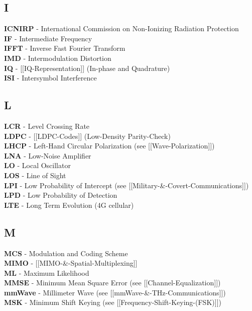 \subsection{I}\label{sec:acronyms-i}

\textbf{ICNIRP} - International Commission on Non-Ionizing Radiation
Protection\\
\textbf{IF} - Intermediate Frequency\\
\textbf{IFFT} - Inverse Fast Fourier Transform\\
\textbf{IMD} - Intermodulation Distortion\\
\textbf{IQ} - {[}{[}IQ-Representation{]}{]} (In-phase and Quadrature)\\
\textbf{ISI} - Intersymbol Interference

\subsection{L}\label{sec:acronyms-l}

\textbf{LCR} - Level Crossing Rate\\
\textbf{LDPC} - {[}{[}LDPC-Codes{]}{]} (Low-Density Parity-Check)\\
\textbf{LHCP} - Left-Hand Circular Polarization (see
{[}{[}Wave-Polarization{]}{]})\\
\textbf{LNA} - Low-Noise Amplifier\\
\textbf{LO} - Local Oscillator\\
\textbf{LOS} - Line of Sight\\
\textbf{LPI} - Low Probability of Intercept (see
{[}{[}Military-\&-Covert-Communications{]}{]})\\
\textbf{LPD} - Low Probability of Detection\\
\textbf{LTE} - Long Term Evolution (4G cellular)

\subsection{M}\label{sec:acronyms-m}

\textbf{MCS} - Modulation and Coding Scheme\\
\textbf{MIMO} - {[}{[}MIMO-\&-Spatial-Multiplexing{]}{]}\\
\textbf{ML} - Maximum Likelihood\\
\textbf{MMSE} - Minimum Mean Square Error (see
{[}{[}Channel-Equalization{]}{]})\\
\textbf{mmWave} - Millimeter Wave (see
{[}{[}mmWave-\&-THz-Communications{]}{]})\\
\textbf{MSK} - Minimum Shift Keying (see
{[}{[}Frequency-Shift-Keying-(FSK){]}{]})

